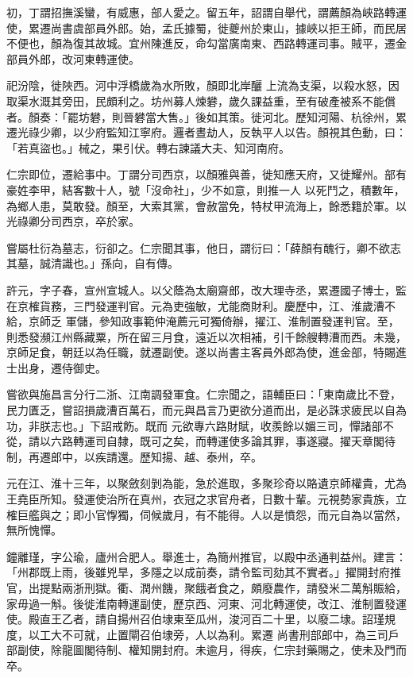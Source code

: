 \begin{pinyinscope}
 初，丁謂招撫溪蠻，有威惠，部人愛之。留五年，詔謂自舉代，謂薦顏為峽路轉運使，累遷尚書虞部員外郎。始，孟氏據蜀，徙夔州於東山，據峽以拒王師，而民居不便也，顏為復其故城。宜州陳進反，命勾當廣南東、西路轉運司事。賊平，遷金部員外郎，改河東轉運使。



 祀汾陰，徙陜西。河中浮橋歲為水所敗，顏即北岸釃
 上流為支渠，以殺水怒，因取渠水溉其旁田，民頗利之。坊州募人煉礬，歲久課益重，至有破產被系不能償者。顏奏：「罷坊礬，則晉礬當大售。」後如其策。徙河北。歷知河陽、杭徐州，累遷光祿少卿，以少府監知江寧府。邏者晝劫人，反執平人以告。顏視其色動，曰：「若真盜也。」械之，果引伏。轉右諫議大夫、知河南府。



 仁宗即位，遷給事中。丁謂分司西京，以顏雅與善，徙知應天府，又徙耀州。部有豪姓李甲，結客數十人，號「沒命社」，少不如意，則推一人
 以死鬥之，積數年，為鄉人患，莫敢發。顏至，大索其黨，會赦當免，特杖甲流海上，餘悉籍於軍。以光祿卿分司西京，卒於家。



 嘗屬杜衍為墓志，衍卻之。仁宗聞其事，他日，謂衍曰：「薛顏有醜行，卿不欲志其墓，誠清識也。」孫向，自有傳。



 許元，字子春，宣州宣城人。以父蔭為太廟齋郎，改大理寺丞，累遷國子博士，監在京榷貨務，三門發運判官。元為吏強敏，尤能商財利。慶歷中，江、淮歲漕不給，京師乏
 軍儲，參知政事範仲淹薦元可獨倚辦，擢江、淮制置發運判官。至，則悉發瀕江州縣藏粟，所在留三月食，遠近以次相補，引千餘艘轉漕而西。未幾，京師足食，朝廷以為任職，就遷副使。遂以尚書主客員外郎為使，進金部，特賜進士出身，遷侍御史。



 嘗欲與施昌言分行二浙、江南調發軍食。仁宗聞之，語輔臣曰：「東南歲比不登，民力匱乏，嘗詔損歲漕百萬石，而元與昌言乃更欲分道而出，是必誅求疲民以自為功，非朕志也。」下詔戒飭。既而
 元欲專六路財賦，收羨餘以媚三司，憚諸部不從，請以六路轉運司自隸，既可之矣，而轉運使多論其罪，事遂寢。擢天章閣待制，再遷郎中，以疾請還。歷知揚、越、泰州，卒。



 元在江、淮十三年，以聚斂刻剝為能，急於進取，多聚珍奇以賂遺京師權貴，尤為王堯臣所知。發運使治所在真州，衣冠之求官舟者，日數十輩。元視勢家貴族，立榷巨艦與之；即小官惸獨，伺候歲月，有不能得。人以是憤怨，而元自為以當然，無所愧憚。



 鐘離瑾，字公瑜，廬州合肥人。舉進士，為簡州推官，以殿中丞通判益州。建言：「州郡既上雨，後雖兇旱，多隱之以成前奏，請令監司劾其不實者。」擢開封府推官，出提點兩浙刑獄。衢、潤州饑，聚餓者食之，頗廢農作，請發米二萬斛賑給，家毋過一斛。後徙淮南轉運副使，歷京西、河東、河北轉運使，改江、淮制置發運使。殿直王乙者，請自揚州召伯埭東至瓜州，浚河百二十里，以廢二埭。詔瑾規度，以工大不可就，止置閘召伯埭旁，人以為利。累遷
 尚書刑部郎中，為三司戶部副使，除龍圖閣待制、權知開封府。未逾月，得疾，仁宗封藥賜之，使未及門而卒。




\end{pinyinscope}
